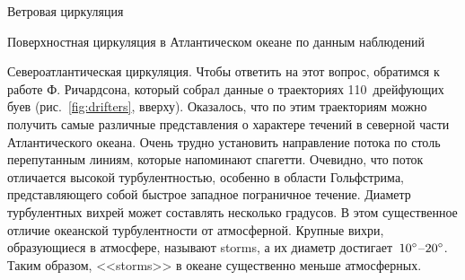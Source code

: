 \begin{chapter}{Ветровая циркуляция}
\begin{section}{Поверхностная циркуляция в Атлантическом океане по данным наблюдений}
\begin{paragraph}{Североатлантическая циркуляция.}
Чтобы ответить на этот вопрос, обратимся к работе Ф. Ричардсона, который
собрал данные о траекториях 110~дрейфующих буев 
(рис.~\ref{fig:drifters}, вверху). Оказалось, что по этим траекториям можно
получить самые различные представления о характере течений в северной части
Атлантического океана. Очень трудно установить направление потока по столь
перепутанным линиям, которые напоминают спагетти. Очевидно, что
поток отличается высокой турбулентностью, особенно в области 
Гольфстрима, 
представляющего собой быстрое западное пограничное течение. 
Диаметр турбулентных вихрей может составлять несколько градусов. В этом
существенное отличие океанской турбулентности 
от атмосферной. Крупные вихри, образующиеся в атмосфере, называют storms, 
а их диаметр достигает~${10}^\circ$--${20}^\circ$. Таким образом, 
<<storms>> в океане существенно меньше атмосферных.
%


\end{paragraph}
\end{section}
\end{chapter}

